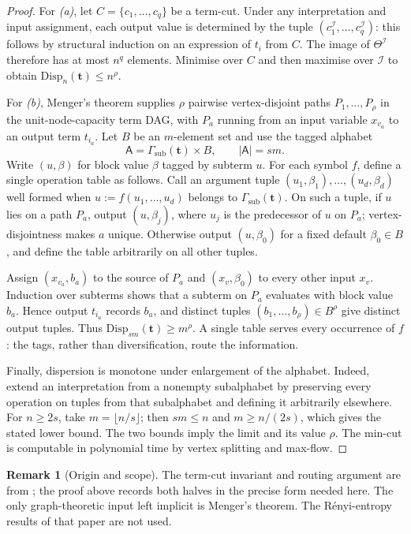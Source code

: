 \documentclass[11pt]{article}
\newcommand{\textcite}[1]{\citet{#1}}
\theoremstyle{definition}
\newtheorem{remark}{Remark}[section]
\theoremstyle{plain}
\newcommand{\A}{\mathsf{A}}
\newcommand{\Disp}{\mathrm{Disp}}
\begin{document}
\begin{proof}
For \textit{(a)}, let $C=\{c_1,\dots,c_q\}$ be a term-cut.  Under any interpretation and input assignment,
each output value is determined by the tuple
$(c_1^\mathcal I,\dots,c_q^\mathcal I)$: this follows by structural induction on an expression of $t_i$ from
$C$.  The image of $\Theta^\mathcal I$ therefore has at most $n^q$ elements.  Minimise over $C$ and then
maximise over $\mathcal I$ to obtain $\Disp_n(\mathbf t)\le n^\rho$.

For \textit{(b)}, Menger's theorem \citep{menger1927} supplies $\rho$ pairwise vertex-disjoint paths
$P_1,\dots,P_\rho$ in the unit-node-capacity term DAG, with $P_a$ running from an input variable
$x_{v_a}$ to an output term $t_{i_a}$.  Let $B$ be an $m$-element set and use the tagged alphabet
\[
\A=\Gamma_{\mathrm{sub}}(\mathbf t)\times B,
\qquad |\A|=sm.
\]
Write $(u,\beta)$ for block value $\beta$ tagged by subterm $u$.  For each symbol $f$, define a single
operation table as follows.  Call an argument tuple
$(u_1,\beta_1),\dots,(u_d,\beta_d)$ well formed when
$u:=f(u_1,\dots,u_d)$ belongs to $\Gamma_{\mathrm{sub}}(\mathbf t)$.  On such a tuple, if $u$ lies on a path $P_a$,
output $(u,\beta_j)$, where $u_j$ is the predecessor of $u$ on $P_a$; vertex-disjointness makes $a$ unique.
Otherwise output $(u,\beta_0)$ for a fixed default $\beta_0\in B$, and define the table arbitrarily on
all other tuples.

Assign $(x_{v_a},b_a)$ to the source of $P_a$ and $(x_v,\beta_0)$ to every other input $x_v$.  Induction over
subterms shows that a subterm on $P_a$ evaluates with block value $b_a$.  Hence output $t_{i_a}$ records
$b_a$, and distinct tuples $(b_1,\dots,b_\rho)\in B^\rho$ give distinct output tuples.  Thus
$\Disp_{sm}(\mathbf t)\ge m^\rho$.  A single table serves every occurrence of $f$: the tags, rather than
diversification, route the information.

Finally, dispersion is monotone under enlargement of the alphabet.  Indeed, extend an interpretation from a
nonempty subalphabet by preserving every operation on tuples from that subalphabet and defining it arbitrarily
elsewhere.  For $n\ge2s$, take $m=\lfloor n/s\rfloor$; then $sm\le n$ and $m\ge n/(2s)$, which gives the
stated lower bound.  The two bounds imply the limit and its value $\rho$.  The min-cut is computable in
polynomial time by vertex splitting and max-flow.
\end{proof}

\begin{remark}[Origin and scope]
The term-cut invariant and routing argument are from \textcite{riis2019max}; the proof above records both
halves in the precise form needed here.  The only graph-theoretic input left implicit is Menger's theorem.
The R\'enyi-entropy results of that paper are not used.
\end{remark}
\end{document}
